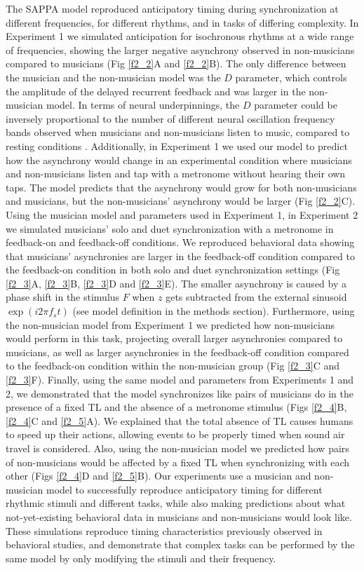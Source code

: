 \documentclass{report}
\begin{document}
The SAPPA model reproduced anticipatory timing during synchronization at different frequencies, for different rhythms, and in tasks of differing complexity. In Experiment 1 we simulated anticipation for isochronous rhythms at a wide range of frequencies, showing the larger negative asynchrony observed in non-musicians compared to musicians (Fig \ref{f2_2}A and \ref{f2_2}B). The only difference between the musician and the non-musician model was the $D$ parameter, which controls the amplitude of the delayed recurrent feedback and was larger in the non-musician model. In terms of neural underpinnings, the $D$ parameter could be inversely proportional to the number of different neural oscillation frequency bands observed when musicians and non-musicians listen to music, compared to resting conditions \cite{bhattacharya2005phase}. Additionally, in Experiment 1 we used our model to predict how the asynchrony would change in an experimental condition where musicians and non-musicians listen and tap with a metronome without hearing their own taps. The model predicts that the asynchrony would grow for both non-musicians and musicians, but the non-musicians' asynchrony would be larger (Fig \ref{f2_2}C). Using the musician model and parameters used in Experiment 1, in Experiment 2 we simulated musicians' solo and duet synchronization with a metronome in feedback-on and feedback-off conditions. We reproduced behavioral data showing that musicians' asynchronies are larger in the feedback-off condition compared to the feedback-on condition in both solo and duet synchronization settings (Fig \ref{f2_3}A, \ref{f2_3}B, \ref{f2_3}D and \ref{f2_3}E). The smaller asynchrony is caused by a phase shift in the stimulus $F$ when $z$ gets subtracted from the external sinusoid $\exp(i2\pi f_s t)$ (see model definition in the methods section). Furthermore, using the non-musician model from Experiment 1 we predicted how non-musicians would perform in this task, projecting overall larger asynchronies compared to musicians, as well as larger asynchronies in the feedback-off condition compared to the feedback-on condition within the non-musician group (Fig \ref{f2_3}C and \ref{f2_3}F). Finally, using the same model and parameters from Experiments 1 and 2, we demonstrated that the model synchronizes like pairs of musicians do in the presence of a fixed TL and the absence of a metronome stimulus (Figs \ref{f2_4}B, \ref{f2_4}C and \ref{f2_5}A). We explained that the total absence of TL causes humans to speed up their actions, allowing events to be properly timed when sound air travel is considered. Also, using the non-musician model we predicted how pairs of non-musicians would be affected by a fixed TL when synchronizing with each other (Figs \ref{f2_4}D and \ref{f2_5}B). Our experiments use a musician and non-musician model to successfully reproduce anticipatory timing for different rhythmic stimuli and different tasks, while also making predictions about what not-yet-existing behavioral data in musicians and non-musicians would look like. These simulations reproduce timing characteristics previously observed in behavioral studies, and demonstrate that complex tasks can be performed by the same model by only modifying the stimuli and their frequency.
\end{document}
